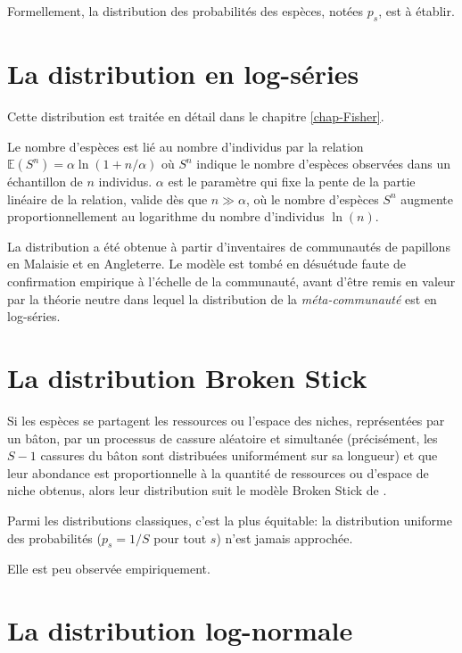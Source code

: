 \documentclass[
  11pt,
  american,
  a4paper,
  extrafontsizes,onecolumn,openright
  ]{memoir}
\begin{document}
Formellement, la distribution des probabilités des espèces, notées \(p_s\), est à établir.

\hypertarget{la-distribution-en-log-suxe9ries}{%
\section{La distribution en log-séries}\label{la-distribution-en-log-suxe9ries}}

Cette distribution est traitée en détail dans le chapitre \ref{chap-Fisher}.

Le nombre d'espèces est lié au nombre d'individus par la relation \({\mathbb E}(S^n) = \alpha \ln(1 + n / \alpha)\) où \(S^n\) indique le nombre d'espèces observées dans un échantillon de \(n\) individus.
\(\alpha\) est le paramètre qui fixe la pente de la partie linéaire de la relation, valide dès que \(n \gg \alpha\), où le nombre d'espèces \(S^n\) augmente proportionnellement au logarithme du nombre d'individus \(\ln(n)\).

La distribution a été obtenue à partir d'inventaires de communautés de papillons en Malaisie et en Angleterre.
Le modèle est tombé en désuétude faute de confirmation empirique à l'échelle de la communauté, avant d'être remis en valeur par la théorie neutre \autocite{Hubbell2001} dans lequel la distribution de la \emph{méta-communauté} est en log-séries.

\hypertarget{la-distribution-broken-stick}{%
\section{La distribution Broken Stick}\label{la-distribution-broken-stick}}

Si les espèces se partagent les ressources ou l'espace des niches, représentées par un bâton, par un processus de cassure aléatoire et simultanée (précisément, les \(S-1\) cassures du bâton sont distribuées uniformément sur sa longueur) et que leur abondance est proportionnelle à la quantité de ressources ou d'espace de niche obtenus, alors leur distribution suit le modèle Broken Stick de \textcite{MacArthur1957}.

Parmi les distributions classiques, c'est la plus équitable: la distribution uniforme des probabilités (\(p_s = 1 / S\) pour tout \(s\)) n'est jamais approchée.

Elle est peu observée empiriquement.

\hypertarget{la-distribution-log-normale}{%
\section{La distribution log-normale}\label{la-distribution-log-normale}}
\end{document}

